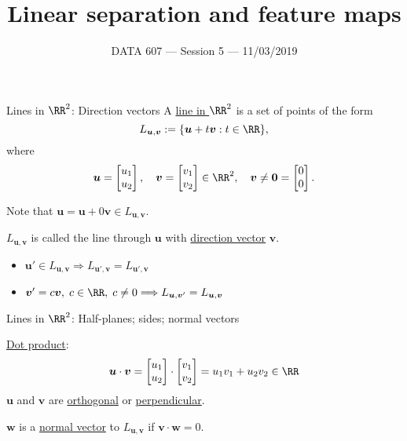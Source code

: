 \documentclass{beamer}
\newcommand{\vu}{\boldsymbol{u}}
\newcommand{\vv}{\boldsymbol{v}}
\renewcommand{\vw}{\boldsymbol{w}}
\newcommand{\vzero}{\boldsymbol{0}}
\begin{document}
    
\setlength{\parskip}{1em}
\begin{frame}
    \title{Linear separation and feature maps}
    \date{DATA 607 --- Session 5 --- 11/03/2019}
    \maketitle
\end{frame}

\begin{frame}{Lines in $\RR^2$: Direction vectors}
    A \underline{line in $\RR^2$} is a set of points of the form
    \[
        L_{\vu, \vv} := \{\vu + t\vv : t\in\RR\},
    \]
    where
    \[
        \vu=\begin{bmatrix}
            u_1\\u_2
        \end{bmatrix},\quad
        \vv=\begin{bmatrix}
            v_1\\v_2
        \end{bmatrix}\in\RR^2,\quad 
        \vv\neq \vzero=\begin{bmatrix}
            0\\0
        \end{bmatrix}. 
    \]

    Note that $\vu=\vu + 0\vv\in L_{\vu, \vv}$.

    $L_{\vu, \vv}$ is called the line through $\vu$ with \underline{direction vector} $\vv$.
    
    \begin{itemize}
        \item $\vu'\in L_{\vu, \vv} \Longrightarrow L_{\vu', \vv}=L_{\vu', \vv}$
        \item $\vv'=c\vv,\; c\in\RR,\; c\neq 0 \Longrightarrow L_{\vu, \vv'}=L_{\vu, \vv}$
    \end{itemize}
\end{frame}

\begin{frame}{Lines in $\RR^2$: Half-planes; sides; normal vectors}


    \underline{Dot product}:
    \[
        \vu\cdot\vv = \begin{bmatrix}
            u_1\\u_2
        \end{bmatrix}\cdot\begin{bmatrix}
            v_1\\v_2
        \end{bmatrix} = u_1 v_1 + u_2 v_2\in\RR
    \]
    $\vu$ and $\vv$ are \underline{orthogonal} or \underline{perpendicular}.

    $\vw$ is a \underline{normal vector} to $L_{\vu, \vv}$ if $\vv\cdot\vw = 0$.
    
    
\end{frame}
\end{document}
